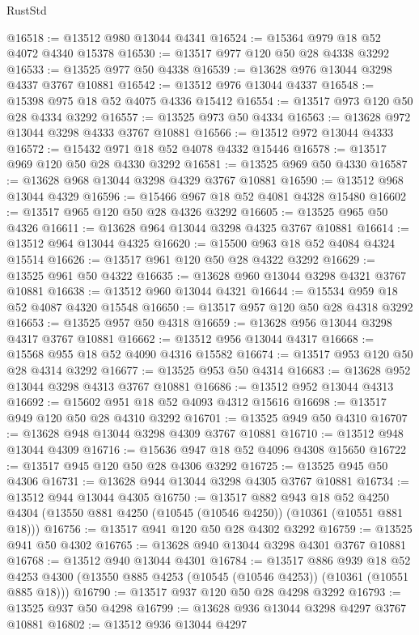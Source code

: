 \begin{lexlean}{RustStd}
\begin{coremodule}
@16518 := @13512 @980 @13044 @4341
@16524 := @15364 @979 @18 @52 @4072 @4340 @15378
@16530 := @13517 @977 @120 @50 @28 @4338 @3292
@16533 := @13525 @977 @50 @4338
@16539 := @13628 @976 @13044 @3298 @4337 @3767 @10881
@16542 := @13512 @976 @13044 @4337
@16548 := @15398 @975 @18 @52 @4075 @4336 @15412
@16554 := @13517 @973 @120 @50 @28 @4334 @3292
@16557 := @13525 @973 @50 @4334
@16563 := @13628 @972 @13044 @3298 @4333 @3767 @10881
@16566 := @13512 @972 @13044 @4333
@16572 := @15432 @971 @18 @52 @4078 @4332 @15446
@16578 := @13517 @969 @120 @50 @28 @4330 @3292
@16581 := @13525 @969 @50 @4330
@16587 := @13628 @968 @13044 @3298 @4329 @3767 @10881
@16590 := @13512 @968 @13044 @4329
@16596 := @15466 @967 @18 @52 @4081 @4328 @15480
@16602 := @13517 @965 @120 @50 @28 @4326 @3292
@16605 := @13525 @965 @50 @4326
@16611 := @13628 @964 @13044 @3298 @4325 @3767 @10881
@16614 := @13512 @964 @13044 @4325
@16620 := @15500 @963 @18 @52 @4084 @4324 @15514
@16626 := @13517 @961 @120 @50 @28 @4322 @3292
@16629 := @13525 @961 @50 @4322
@16635 := @13628 @960 @13044 @3298 @4321 @3767 @10881
@16638 := @13512 @960 @13044 @4321
@16644 := @15534 @959 @18 @52 @4087 @4320 @15548
@16650 := @13517 @957 @120 @50 @28 @4318 @3292
@16653 := @13525 @957 @50 @4318
@16659 := @13628 @956 @13044 @3298 @4317 @3767 @10881
@16662 := @13512 @956 @13044 @4317
@16668 := @15568 @955 @18 @52 @4090 @4316 @15582
@16674 := @13517 @953 @120 @50 @28 @4314 @3292
@16677 := @13525 @953 @50 @4314
@16683 := @13628 @952 @13044 @3298 @4313 @3767 @10881
@16686 := @13512 @952 @13044 @4313
@16692 := @15602 @951 @18 @52 @4093 @4312 @15616
@16698 := @13517 @949 @120 @50 @28 @4310 @3292
@16701 := @13525 @949 @50 @4310
@16707 := @13628 @948 @13044 @3298 @4309 @3767 @10881
@16710 := @13512 @948 @13044 @4309
@16716 := @15636 @947 @18 @52 @4096 @4308 @15650
@16722 := @13517 @945 @120 @50 @28 @4306 @3292
@16725 := @13525 @945 @50 @4306
@16731 := @13628 @944 @13044 @3298 @4305 @3767 @10881
@16734 := @13512 @944 @13044 @4305
@16750 := @13517
    @882
    @943
    @18
    @52
    @4250
    @4304
    (@13550 @881 @4250 (@10545 (@10546 @4250)) (@10361 (@10551 @881 @18)))
@16756 := @13517 @941 @120 @50 @28 @4302 @3292
@16759 := @13525 @941 @50 @4302
@16765 := @13628 @940 @13044 @3298 @4301 @3767 @10881
@16768 := @13512 @940 @13044 @4301
@16784 := @13517
    @886
    @939
    @18
    @52
    @4253
    @4300
    (@13550 @885 @4253 (@10545 (@10546 @4253)) (@10361 (@10551 @885 @18)))
@16790 := @13517 @937 @120 @50 @28 @4298 @3292
@16793 := @13525 @937 @50 @4298
@16799 := @13628 @936 @13044 @3298 @4297 @3767 @10881
@16802 := @13512 @936 @13044 @4297

\end{coremodule}
\end{lexlean}
